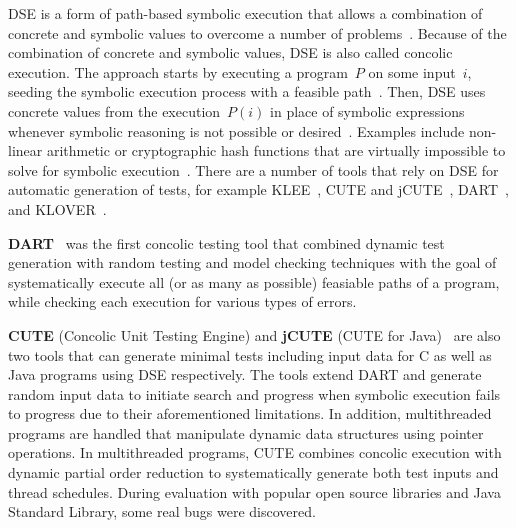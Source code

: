 \documentclass{article}
\begin{document}
\ac{DSE} is a form of path-based symbolic execution that allows a combination of concrete and symbolic values to overcome a number of problems~\cite{Fraser_2013}. Because of the combination of concrete and symbolic values, \ac{DSE} is also called concolic execution. The approach starts by executing a program~$P$ on some input~$i$, seeding the symbolic execution process with a feasible path~\cite{Gupta2000,Korel1992}. Then, \ac{DSE} uses concrete values from the execution~$P(i)$ in place of symbolic expressions whenever symbolic reasoning is not possible or desired~\cite{Cadar2005}. Examples include non-linear arithmetic or cryptographic hash functions that are virtually impossible to solve for symbolic execution~\cite{Ball2015}. There are a number of tools that rely on \ac{DSE} for automatic generation of tests, for example KLEE~\cite{cadar2008klee}, CUTE and jCUTE~\cite{Sen2006}, DART~\cite{Godefroid_2005}, and KLOVER~\cite{Li2011}.

\textbf{DART}~\cite{Godefroid_2005} was the first concolic testing tool that combined dynamic test generation with random testing and model checking techniques with the goal of systematically execute all (or as many as possible) feasiable paths of a program, while checking each execution for various types of errors. 


\textbf{CUTE} (Concolic Unit Testing Engine) and \textbf{jCUTE} (CUTE for Java)~\cite{Sen2006} are also two tools that can generate minimal tests including input data for C as well as Java programs using \ac{DSE} respectively. The tools extend DART and generate random input data to initiate search and progress when symbolic execution fails to progress due to their aforementioned limitations. In addition, multithreaded programs are handled that manipulate dynamic data structures using pointer operations. In multithreaded programs, CUTE combines concolic execution with dynamic partial order reduction to systematically generate both test inputs and thread schedules. During evaluation with popular open source libraries and Java Standard Library, some real bugs were discovered. 
\end{document}
